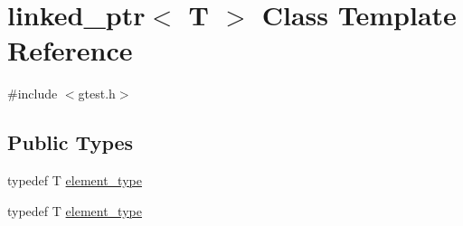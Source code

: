 \hypertarget{classtesting_1_1internal_1_1linked__ptr}{\section{linked\-\_\-ptr$<$ \-T $>$ \-Class \-Template \-Reference}
\label{d9/df4/classtesting_1_1internal_1_1linked__ptr}
}


{\ttfamily \#include $<$gtest.\-h$>$}

\subsection*{\-Public \-Types}
\begin{DoxyCompactItemize}
\item 
typedef \-T \hyperlink{classtesting_1_1internal_1_1linked__ptr_ae37fb942067e67c711beb897e7b7b5de}{element\-\_\-type}
\item 
typedef \-T \hyperlink{classtesting_1_1internal_1_1linked__ptr_ae37fb942067e67c711beb897e7b7b5de}{element\-\_\-type}
\end{DoxyCompactItemize}
